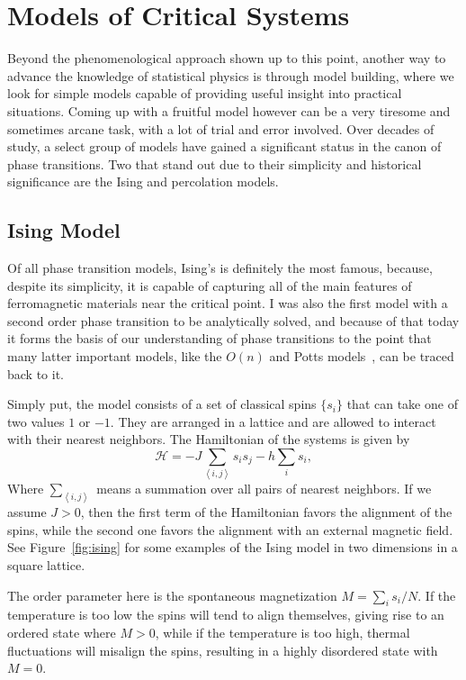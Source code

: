 \section{Models of Critical Systems}
\label{sec:models}

Beyond the phenomenological approach shown up to this point, another way to
advance the knowledge of statistical physics is through model building, where
we look for simple models capable of providing useful insight into practical
situations. Coming up with a fruitful model however can be a very tiresome and
sometimes arcane task, with a lot of trial and error involved. Over decades of
study, a select group of models have gained a significant status in the canon
of phase transitions. Two that stand out due to their simplicity and historical
significance are the Ising and percolation models.


\subsection{Ising Model}
\label{sec:ising}

Of all phase transition models, Ising's is definitely the most famous, because,
despite its simplicity, it is capable of capturing all of the main features of
ferromagnetic materials near the critical point. I was also the first model
with a second order phase transition to be analytically solved, and because of
that today it forms the basis of our understanding of phase transitions to
the point that many latter important models, like the $O(n)$ and Potts
models~\cite{Wu1982}, can be traced back to it.

Simply put, the model consists of a set of classical spins $\{s_i\}$ that can
take one of two values $1$ or $-1$. They are arranged in a lattice and are
allowed to interact with their nearest neighbors. The Hamiltonian of the
systems is given by
\begin{equation}
    \mathcal{H}=
    -J\sum_{\left\langle i,j\right\rangle }s_{i}s_{j}
    -h\sum_{i}s_{i},
\end{equation}
Where $\sum_{\left\langle i,j\right\rangle}$ means a summation over all pairs
of nearest neighbors. If we assume $J>0$, then the first term of the
Hamiltonian favors the alignment of the spins, while the second one favors the
alignment with an external magnetic field. See Figure~\ref{fig:ising} for some
examples of the Ising model in two dimensions in a square lattice.

The order parameter here is the spontaneous magnetization $M=\sum_i s_i / N$.
If the temperature is too low the spins will tend to align themselves, giving
rise to an ordered state where $M>0$, while if the temperature is too high,
thermal fluctuations will misalign the spins, resulting in a highly disordered
state with $M=0$.

